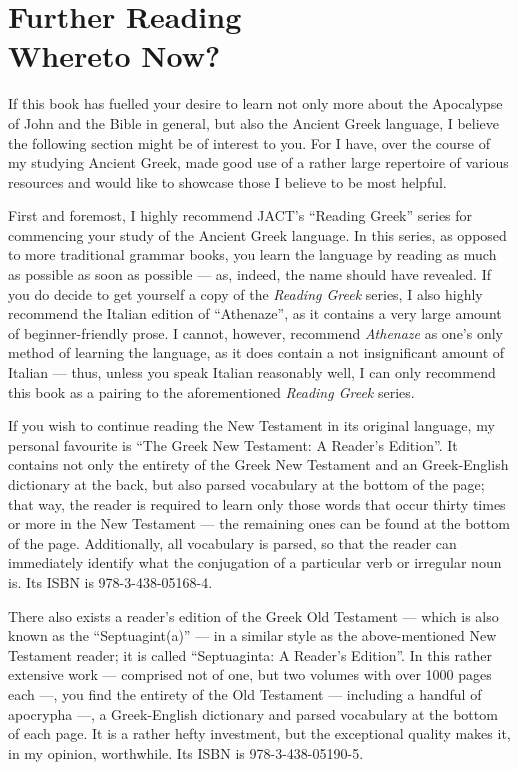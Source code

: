 \chapter*{Further Reading \\ \large Whereto Now?}
  
If this book has fuelled your desire to learn not only more about the Apocalypse of John and the Bible in general, but also the Ancient Greek language, I believe the following section might be of interest to you. For I have, over the course of my studying Ancient Greek, made good use of a rather large repertoire of various resources and would like to showcase those I believe to be most helpful. 

First and foremost, I highly recommend JACT's ``Reading Greek'' series for commencing your study of the Ancient Greek language. In this series, as opposed to more traditional grammar books, you learn the language by reading as much as possible as soon as possible — as, indeed, the name should have revealed. If you do decide to get yourself a copy of the \textit{Reading Greek} series, I also highly recommend the Italian edition of ``Athenaze'', as it contains a very large amount of beginner-friendly prose. I cannot, however, recommend \textit{Athenaze} as one's only method of learning the language, as it does contain a not insignificant amount of Italian — thus, unless you speak Italian reasonably well, I can only recommend this book as a pairing to the aforementioned \textit{Reading Greek} series.

If you wish to continue reading the New Testament in its original language, my personal favourite is “The Greek New Testament: A Reader's Edition”. It contains not only the entirety of the Greek New Testament and an Greek-English dictionary at the back, but also parsed vocabulary at the bottom of the page; that way, the reader is required to learn only those words that occur thirty times or more in the New Testament — the remaining ones can be found at the bottom of the page. Additionally, all vocabulary is parsed, so that the reader can immediately identify what the conjugation of a particular verb or irregular noun is. Its ISBN is 978-3-438-05168-4.

There also exists a reader’s edition of the Greek Old Testament — which is also known as the “Septuagint(a)” — in a similar style as the above-mentioned New Testament reader; it is called “Septuaginta: A Reader's Edition”. In this rather extensive work — comprised not of one, but two volumes with over 1000 pages each —, you find the entirety of the Old Testament — including a handful of apocrypha —, a Greek-English dictionary and parsed vocabulary at the bottom of each page. It is a rather hefty investment, but the exceptional quality makes it, in my opinion, worthwhile. Its ISBN is 978-3-438-05190-5.

